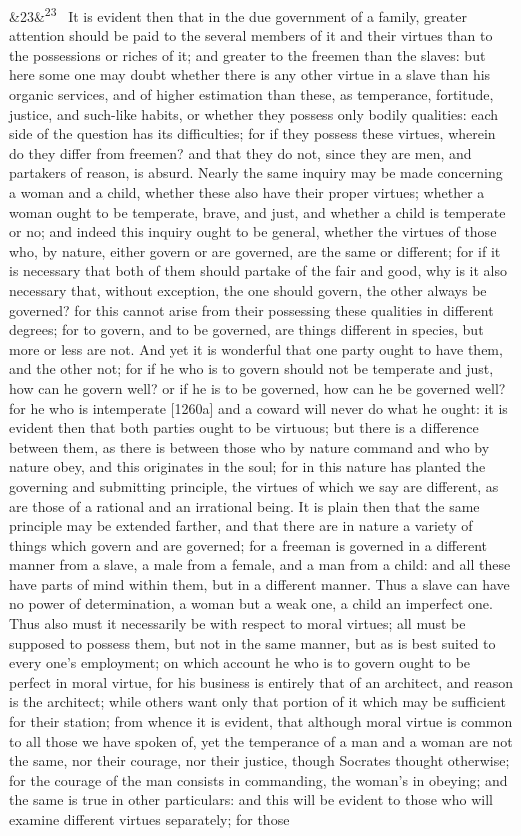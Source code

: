 \documentclass[12pt]{article}
\newcommand{\para}[1][]{\par\noindent\ifx&#1&\else\textsuperscript{\footnotesize #1}~\fi}
\begin{document}
\para[23] It is evident then that in the due government of a family, greater attention should be paid to the several members of it and their virtues than to the possessions or riches of it; and greater to the freemen than the slaves: but here some one may doubt whether there is any other virtue in a slave than his organic services, and of higher estimation than these, as temperance, fortitude, justice, and such-like habits, or whether they possess only bodily qualities: each side of the question has its difficulties; for if they possess these virtues, wherein do they differ from freemen? and that they do not, since they are men, and partakers of reason, is absurd. Nearly the same inquiry may be made concerning a woman and a child, whether these also have their proper virtues; whether a woman ought to be temperate, brave, and just, and whether a child is temperate or no; and indeed this inquiry ought to be general, whether the virtues of those who, by nature, either govern or are governed, are the same or different; for if it is necessary that both of them should partake of the fair and good, why is it also necessary that, without exception, the one should govern, the other always be governed? for this cannot arise from their possessing these qualities in different degrees; for to govern, and to be governed, are things different in species, but more or less are not. And yet it is wonderful that one party ought to have them, and the other not; for if he who is to govern should not be temperate and just, how can he govern well? or if he is to be governed, how can he be governed well? for he who is intemperate [1260a] and a coward will never do what he ought: it is evident then that both parties ought to be virtuous; but there is a difference between them, as there is between those who by nature command and who by nature obey, and this originates in the soul; for in this nature has planted the governing and submitting principle, the virtues of which we say are different, as are those of a rational and an irrational being. It is plain then that the same principle may be extended farther, and that there are in nature a variety of things which govern and are governed; for a freeman is governed in a different manner from a slave, a male from a female, and a man from a child: and all these have parts of mind within them, but in a different manner. Thus a slave can have no power of determination, a woman but a weak one, a child an imperfect one. Thus also must it necessarily be with respect to moral virtues; all must be supposed to possess them, but not in the same manner, but as is best suited to every one's employment; on which account he who is to govern ought to be perfect in moral virtue, for his business is entirely that of an architect, and reason is the architect; while others want only that portion of it which may be sufficient for their station; from whence it is evident, that although moral virtue is common to all those we have spoken of, yet the temperance of a man and a woman are not the same, nor their courage, nor their justice, though Socrates thought otherwise; for the courage of the man consists in commanding, the woman's in obeying; and the same is true in other particulars: and this will be evident to those who will examine different virtues separately; for those 
\end{document}
